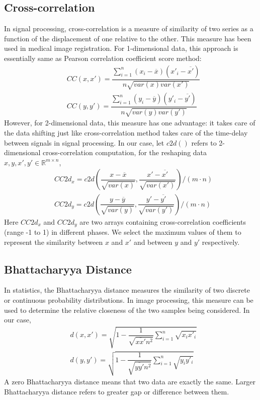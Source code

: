 \documentclass[12pt]{report} %
\begin{document}
\subsection{Cross-correlation}
In signal processing, cross-correlation\cite{CC} is a measure of similarity of two series as a function of the displacement of one relative to the other. This measure has been used in medical image registration. For 1-dimensional data, this approach is essentially same as Pearson correlation coefficient score method:
\begin{equation}
\begin{split}
&CC(x,x')=\dfrac{\sum_{i=1}^{n} (x_i-\overline{x})(x'_i-\overline{x'})}{n \sqrt{var(x)var(x')}}\\
&CC(y,y')=\dfrac{\sum_{i=1}^{n} (y_i-\overline{y})(y'_i-\overline{y'})}{n \sqrt{var(y)var(y')}}
\end{split}
\end{equation}
However, for 2-dimensional data, this measure has one advantage: it takes care of the data shifting just like cross-correlation method takes care of the time-delay between signals in signal processing. In our case, let $c2d()$ refers to 2-dimensional cross-correlation computation, for the reshaping data $x,y,x',y' \in \mathbb{R}^{m\times n}$,
\begin{equation}
\begin{split}
&CC2d_x = c2d(\dfrac{x-\overline{x}}{\sqrt{var(x)}},\dfrac{x'-\overline{x'}}{\sqrt{var(x')}})/(m\cdot n) \\
&CC2d_y = c2d(\dfrac{y-\overline{y}}{\sqrt{var(y)}},\dfrac{y'-\overline{y'}}{\sqrt{var(y')}})/(m\cdot n)
\end{split}
\end{equation}
Here $CC2d_x$ and $CC2d_y$ are two arrays containing cross-correlation coefficients (range -1 to 1) in different phases. We select the maximum values of them to represent the similarity between $x$ and $x'$ and between $y$ and $y'$ respectively.

\subsection{Bhattacharyya Distance}
In statistics, the Bhattacharyya distance\cite{BD,BD2,ISA} measures the similarity of two discrete or continuous probability distributions. In image processing, this measure can be used to determine the relative closeness of the two samples being considered. In our case\cite{ISA},
\begin{equation}
\begin{split}
&d(x,x')=\sqrt{1-\dfrac{1}{\sqrt{\overline{xx'}n^2}}\sum_{i=1}^{n} \sqrt{x_{i}x'_{i}}}\\
&d(y,y')=\sqrt{1-\dfrac{1}{\sqrt{\overline{yy'}n^2}}\sum_{i=1}^{n} \sqrt{y_{i}y'_{i}}}
\end{split}
\end{equation}
A zero Bhattacharyya distance means that two data are exactly the same. Larger Bhattacharyya distance refers to greater gap or difference between them.
\end{document}
